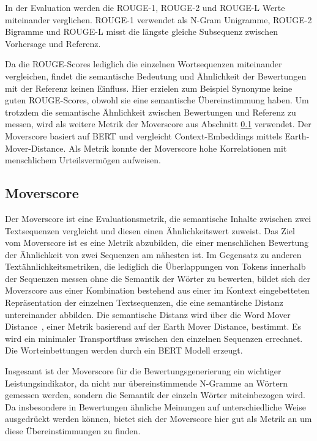 In der Evaluation werden die ROUGE-1, ROUGE-2 und ROUGE-L Werte miteinander verglichen.
ROUGE-1 verwendet als N-Gram Unigramme, ROUGE-2 Bigramme und ROUGE-L misst die längste gleiche Subsequenz zwischen Vorhersage und Referenz.

Da die ROUGE-Scores lediglich die einzelnen Wortsequenzen miteinander vergleichen, findet die semantische Bedeutung und Ähnlichkeit der Bewertungen mit der Referenz keinen Einfluss.
Hier erzielen zum Beispiel Synonyme keine guten ROUGE-Scores, obwohl sie eine semantische Übereinstimmung haben.
Um trotzdem die semantische Ähnlichkeit zwischen Bewertungen und Referenz zu messen, wird als weitere Metrik der Moverscore aus Abschnitt \ref{moverscore} verwendet.
Der Moverscore basiert auf BERT und vergleicht Context-Embeddings mittels Earth-Mover-Distance. Als Metrik konnte der Moverscore hohe Korrelationen mit menschlichem Urteilsvermögen aufweisen.


\subsection{Moverscore}
\label{moverscore}
Der Moverscore \citep{moverscore_paper} ist eine Evaluationsmetrik, die semantische Inhalte zwischen zwei Textsequenzen vergleicht und diesen einen Ähnlichkeitswert zuweist.
Das Ziel vom Moverscore ist es eine Metrik abzubilden, die einer menschlichen Bewertung der Ähnlichkeit von zwei Sequenzen am nähesten ist. 
Im Gegensatz zu anderen Textähnlichkeitsmetriken, die lediglich die Überlappungen von Tokens innerhalb der Sequenzen messen ohne die Semantik der Wörter zu bewerten, 
bildet sich der Moverscore aus einer Kombination bestehend aus einer im Kontext eingebetteten Repräsentation der einzelnen Textsequenzen, die eine semantische Distanz untereinander abbilden.
Die semantische Distanz wird über die Word Mover Distance \citep{wordmoverdistance}, einer Metrik basierend auf der Earth Mover Distance, bestimmt. Es wird ein minimaler Transportfluss zwischen den einzelnen Sequenzen errechnet.
Die Worteinbettungen werden durch ein BERT Modell erzeugt.

Insgesamt ist der Moverscore für die Bewertungsgenerierung ein wichtiger Leistungsindikator, da nicht nur übereinstimmende N-Gramme an Wörtern gemessen werden, sondern die Semantik der einzeln Wörter miteinbezogen wird. 
Da insbesondere in Bewertungen ähnliche Meinungen auf unterschiedliche Weise ausgedrückt werden können, bietet sich der Moverscore hier gut als Metrik an um diese Übereinstimmungen zu finden.


